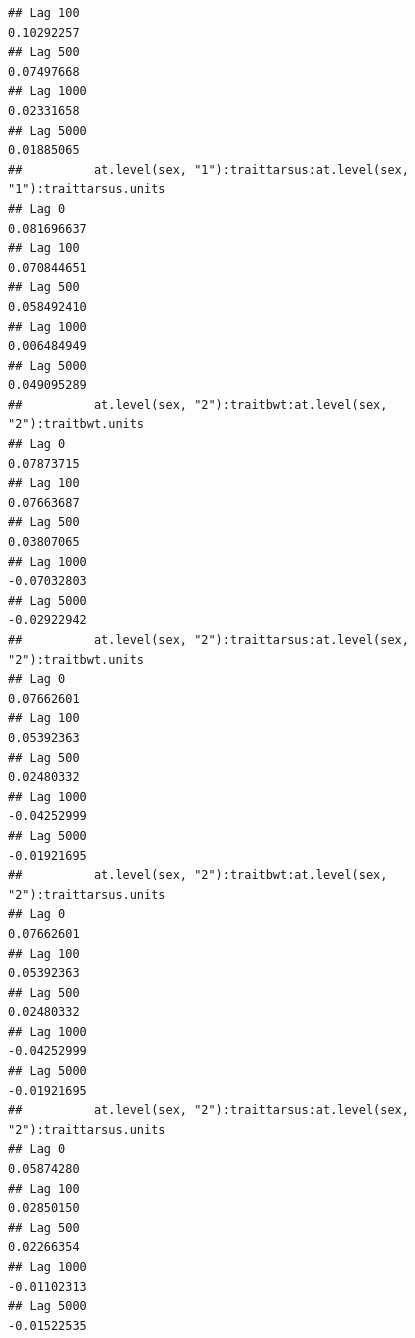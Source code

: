 \documentclass[
  12pt,
]{book}
\begin{document}
\begin{verbatim}
## Lag 100                                                        0.10292257
## Lag 500                                                        0.07497668
## Lag 1000                                                       0.02331658
## Lag 5000                                                       0.01885065
##          at.level(sex, "1"):traittarsus:at.level(sex, "1"):traittarsus.units
## Lag 0                                                            0.081696637
## Lag 100                                                          0.070844651
## Lag 500                                                          0.058492410
## Lag 1000                                                         0.006484949
## Lag 5000                                                         0.049095289
##          at.level(sex, "2"):traitbwt:at.level(sex, "2"):traitbwt.units
## Lag 0                                                       0.07873715
## Lag 100                                                     0.07663687
## Lag 500                                                     0.03807065
## Lag 1000                                                   -0.07032803
## Lag 5000                                                   -0.02922942
##          at.level(sex, "2"):traittarsus:at.level(sex, "2"):traitbwt.units
## Lag 0                                                          0.07662601
## Lag 100                                                        0.05392363
## Lag 500                                                        0.02480332
## Lag 1000                                                      -0.04252999
## Lag 5000                                                      -0.01921695
##          at.level(sex, "2"):traitbwt:at.level(sex, "2"):traittarsus.units
## Lag 0                                                          0.07662601
## Lag 100                                                        0.05392363
## Lag 500                                                        0.02480332
## Lag 1000                                                      -0.04252999
## Lag 5000                                                      -0.01921695
##          at.level(sex, "2"):traittarsus:at.level(sex, "2"):traittarsus.units
## Lag 0                                                             0.05874280
## Lag 100                                                           0.02850150
## Lag 500                                                           0.02266354
## Lag 1000                                                         -0.01102313
## Lag 5000                                                         -0.01522535

\end{verbatim}
\end{document}
